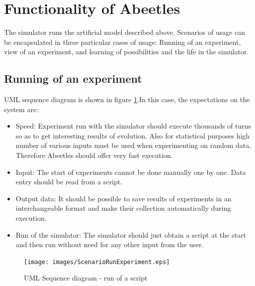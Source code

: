 \documentclass[a4paper,12pt]{report}
\begin{document}
\section{Functionality of Abeetles}

The simulator runs the artificial model described above. Scenarios of usage can be encapsulated in three particular cases of usage: Running of an experiment, view of an experiment, and learning of possibilities and the life in the simulator.

\subsection {Running of an experiment}
UML sequence diagram is shown in figure \ref{obr.ScenarioRunExperiment}.In this case, the expectations on the system are:
\begin{itemize}
\item Speed: Experiment run with the simulator should execute thousands of turns so as to get interesting results of evolution. Also for statistical purposes high number of various inputs must be used when experimenting on random data. Therefore Abeetles should offer very fast execution. 
\item Input: The start of experiments cannot be done manually one by one. Data entry should be read from a script. 
\item Output data: It should be possible to save results of experiments in an interchangeable format and make their collection automatically during execution.
\item Run of the simulator: The simulator should just obtain a script at the start and then run without need for any other input from the user. 

\end{itemize}

\begin{figure}
\begin{center}
  \texttt{[image: images/ScenarioRunExperiment.eps]} 
  \caption{UML Sequence diagram - run of a script}
  \label{obr.ScenarioRunExperiment}
\end{center}
\end{figure}
\end{document}
